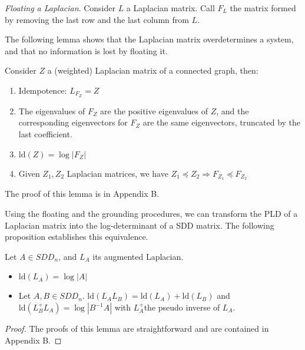 \begin{definition}\emph{Floating a Laplacian}. Consider $L$ a Laplacian
matrix. Call $F_{L}$ the matrix formed by removing the last row and
the last column from $L$.

\end{definition}

The following lemma shows that the Laplacian matrix overdetermines
a system, and that no information is lost by floating it.

\begin{lemma}\label{lem:floating-properties}Consider $Z$ a (weighted)
Laplacian matrix of a connected graph, then: 
\begin{enumerate}
\item Idempotence: $L_{F_{Z}}=Z$ 
\item The eigenvalues of $F_{Z}$ are the positive eigenvalues of $Z$,
and the corresponding eigenvectors for $F_{Z}$ are the same eigenvectors,
truncated by the last coefficient. 
\item $\text{ld}\left(Z\right)=\log\left|F_{Z}\right|$ 
\item Given $Z_{1},Z_{2}$ Laplacian matrices, we have $Z_{1}\preceq Z_{2}\Rightarrow F_{Z_{1}}\preceq F_{Z_{2}}$ 
\end{enumerate}
\end{lemma}

The proof of this lemma is in Appendix B.

Using the floating and the grounding procedures, we can transform
the PLD of a Laplacian matrix into the log-determinant of a SDD matrix.
The following proposition establishes this equivalence.

\begin{lemma} \label{pro:pld-properties}Let $A\in SDD_{n}$, and
$L_{A}$ its augmented Laplacian. 
\begin{itemize}
\item $\text{ld}\left(L_{A}\right)=\log\left|A\right|$ 
\item Let $A,B\in SDD_{n}$. $\text{ld}\left(L_{A}L_{B}\right)=\text{ld}\left(L_{A}\right)+\text{ld}\left(L_{B}\right)$
and $\text{ld}\left(L_{B}^{+}L_{A}\right)=\log\left|B^{-1}A\right|$
with $L_{A}^{+}$the pseudo inverse of $L_{A}$. 
\end{itemize}
\end{lemma}

\begin{proof}The proofs of this lemma are straightforward and are
contained in Appendix B. \end{proof}


